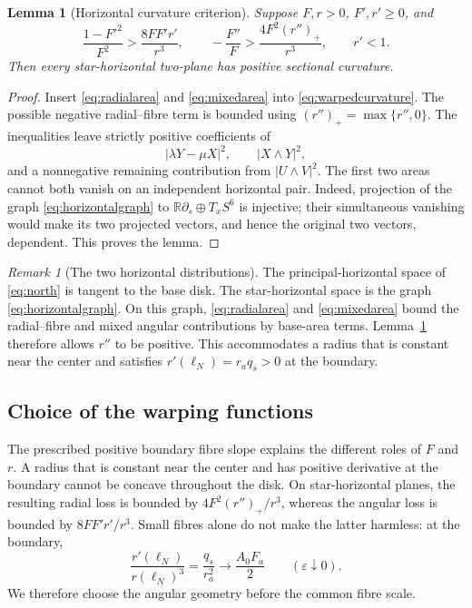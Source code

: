 \documentclass[12pt]{amsart}
\numberwithin{equation}{section}
\newtheorem{lemma}[theorem]{Lemma}
\theoremstyle{remark}
\newtheorem{remark}[theorem]{Remark}
\newcommand{\Rr}{\mathbb R}
\newcommand{\eps}{\varepsilon}
\begin{document}
\begin{lemma}[Horizontal curvature criterion]\label{lem:northcriterion}
Suppose \(F,r>0\), \(F',r'\ge0\), and
\begin{equation}\label{eq:northcriterion}
\frac{1-F'^2}{F^2}>\frac{8FF'r'}{r^3},\qquad
-\frac{F''}{F}>\frac{4F^2(r'')_+}{r^3},\qquad r'<1.
\end{equation}
Then every star-horizontal two-plane has positive sectional curvature.
\end{lemma}
\begin{proof}
Insert \eqref{eq:radialarea} and \eqref{eq:mixedarea} into
\eqref{eq:warpedcurvature}. The possible negative radial--fibre
term is bounded using \((r'')_+=\max\{r'',0\}\).
The inequalities leave strictly positive coefficients of
\[
|\lambda Y-\mu X|^2,\qquad |X\wedge Y|^2,
\]
and a nonnegative remaining contribution from \(|U\wedge V|^2\).
The first two areas cannot both vanish on an independent horizontal
pair. Indeed, projection of the graph \eqref{eq:horizontalgraph}
to \(\Rr\partial_s\oplus T_xS^6\) is injective; their simultaneous
vanishing would make its two projected vectors, and hence the
original two vectors, dependent. This proves the lemma.
\end{proof}

\begin{remark}[The two horizontal distributions]\label{rem:horizontaldistributions}
The principal-horizontal space of \eqref{eq:north} is tangent to the
base disk. The star-horizontal space is the graph
\eqref{eq:horizontalgraph}. On this graph, \eqref{eq:radialarea}
and \eqref{eq:mixedarea} bound the radial--fibre and mixed angular
contributions by base-area terms. Lemma~\ref{lem:northcriterion}
therefore allows \(r''\) to be positive. This accommodates a radius
that is constant near the center and satisfies
\(r'(\ell_N)=r_aq_s>0\) at the boundary.
\end{remark}

\subsection{Choice of the warping functions}

The prescribed positive boundary fibre slope explains the different
roles of \(F\) and \(r\). A radius that is constant near the
center and has positive derivative at the boundary cannot be
concave throughout the disk. On star-horizontal planes, the
resulting radial loss is bounded by \(4F^2(r'')_+/r^3\), whereas
the angular loss is bounded by \(8FF'r'/r^3\). Small fibres alone
do not make the latter harmless: at the boundary,
\[
 \frac{r'(\ell_N)}{r(\ell_N)^3}
 =\frac{q_s}{r_a^2}\longrightarrow\frac{A_0F_a}{2}
 \qquad(\eps\downarrow0).
\]
We therefore choose the angular geometry before the common fibre
scale.
\end{document}
